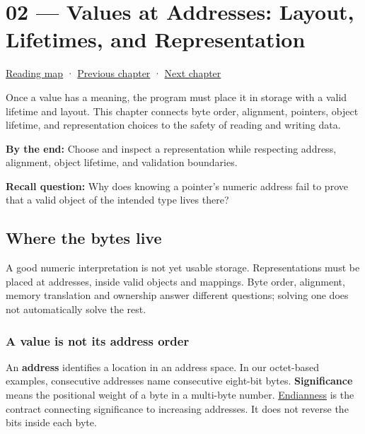 \hypertarget{01-foundations-i-ch002}{}
\chapter{02 --- Values at Addresses: Layout, Lifetimes, and Representation}\label{01-foundations-i-ch002-values-at-addresses-layout-lifetimes-and-representation}

\hyperref[volume-reading-map]{Reading map} · \hyperref[01-foundations-i-ch001-from-bits-to-running-systems]{Previous chapter} · \hyperref[01-foundations-i-ch003-records-as-resource-transactions]{Next chapter}

Once a value has a meaning, the program must place it in storage with a valid lifetime and layout. This chapter connects byte order, alignment, pointers, object lifetime, and representation choices to the safety of reading and writing data.

\textbf{By the end:} Choose and inspect a representation while respecting address, alignment, object lifetime, and validation boundaries.

\textbf{Recall question:} Why does knowing a pointer's numeric address fail to prove that a valid object of the intended type lives there?

\section{Where the bytes live}\label{01-foundations-i-ch002-where-the-bytes-live}

A good numeric interpretation is not yet usable storage. Representations must be placed at addresses, inside valid objects and mappings. Byte order, alignment, memory translation and ownership answer different questions; solving one does not automatically solve the rest.

\subsection{A value is not its address order}\label{01-foundations-i-ch002-a-value-is-not-its-address-order}

An \textbf{address} identifies a location in an address space. In our octet-based examples, consecutive addresses name consecutive eight-bit bytes. \textbf{Significance} means the positional weight of a byte in a multi-byte number. \hyperref[appendix-bc07c3d25b18]{Endianness} is the contract connecting significance to increasing addresses. It does not reverse the bits inside each byte.

